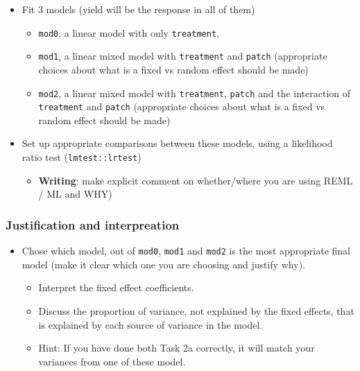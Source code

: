 \documentclass[
  openany]{book}
\providecommand{\tightlist}{%
  \setlength{\itemsep}{0pt}\setlength{\parskip}{0pt}}
\begin{document}
\begin{itemize}
\tightlist
\item
  Fit 3 models (yield will be the response in all of them)

  \begin{itemize}
  \tightlist
  \item
    \texttt{mod0}, a linear model with only \texttt{treatment},
  \item
    \texttt{mod1}, a linear mixed model with \texttt{treatment} and \texttt{patch} (appropriate choices about what is a fixed vs random effect should be made)
  \item
    \texttt{mod2}, a linear mixed model with \texttt{treatment}, \texttt{patch} and the interaction of \texttt{treatment} and \texttt{patch} (appropriate choices about what is a fixed vs random effect should be made)
  \end{itemize}
\item
  Set up appropriate comparisons between these models, using a likelihood ratio test (\texttt{lmtest::lrtest})

  \begin{itemize}
  \tightlist
  \item
    \textbf{Writing}: make explicit comment on whether/where you are using REML / ML and WHY)
  \end{itemize}
\end{itemize}

\hypertarget{justification-and-interpreation}{%
\subsubsection{Justification and interpreation}\label{justification-and-interpreation}}

\begin{itemize}
\tightlist
\item
  Chose which model, out of \texttt{mod0}, \texttt{mod1} and \texttt{mod2} is the most appropriate final model (make it clear which one you are choosing and justify why).

  \begin{itemize}
  \tightlist
  \item
    Interpret the fixed effect coefficients.
  \item
    Discuss the proportion of variance, not explained by the fixed effects, that is explained by each source of variance in the model.
  \item
    Hint: If you have done both Task 2a correctly, it will match your variances from one of these model.
  \end{itemize}
\end{itemize}
\end{document}
